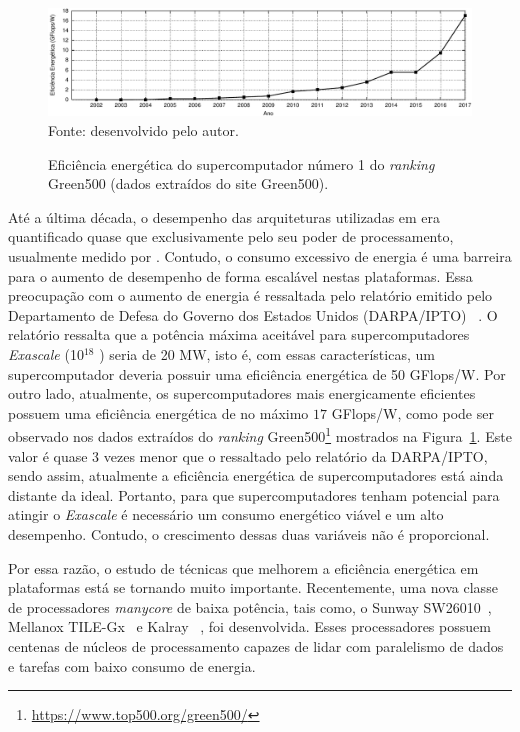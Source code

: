 
\begin{figure}[t]
	\centering
	\caption{Eficiência energética do supercomputador número 1 do
        \textit{ranking} Green500 (dados extraídos do site Green500).}
    \includegraphics[width=\textwidth]{figs/green500.pdf} \\
    Fonte: desenvolvido pelo autor.
	\label{fig:graphEnergy}
\end{figure}


Até a última década, o desempenho das arquiteturas utilizadas em \hpc era quantificado quase
que exclusivamente pelo seu poder de processamento, usualmente medido por
\flops. Contudo, o consumo excessivo de energia é uma barreira para o aumento de
desempenho de forma escalável nestas plataformas.
Essa preocupação com o aumento de energia é ressaltada pelo relatório emitido
pelo Departamento de Defesa do Governo dos Estados Unidos (DARPA/IPTO)
~\cite{Kogge2008}. O relatório ressalta que a potência máxima aceitável para supercomputadores
\textit{Exascale} (10$^{18}$ \flops) seria de 20 MW, isto é, com
essas características, um supercomputador deveria possuir uma eficiência energética de 50 GFlops/W.
Por outro lado, atualmente, os supercomputadores mais energicamente eficientes
possuem uma eficiência energética de no máximo $17$ GFlops/W, como pode ser observado nos dados extraídos do \textit{ranking}
Green500\footnote{\url{https://www.top500.org/green500/}} mostrados na Figura~\ref{fig:graphEnergy}.
Este valor é quase 3 vezes menor que o ressaltado pelo
relatório da DARPA/IPTO, sendo assim, atualmente a eficiência energética de
supercomputadores está ainda distante da ideal. Portanto, para que
supercomputadores tenham potencial para atingir o \textit{Exascale} é necessário
um consumo energético viável e um alto desempenho. Contudo, o crescimento dessas
duas variáveis não é proporcional.


Por essa razão, o estudo de técnicas que melhorem a eficiência energética em
plataformas \hpc está se tornando muito importante.  Recentemente, uma nova
classe de processadores \textit{manycore} de baixa potência, tais como, o Sunway
SW26010~\cite{sunway:2016}, Mellanox TILE-Gx~\cite{Valero:2012} e Kalray
\mppa~\cite{Castro-IA3:2013}, foi desenvolvida. Esses processadores possuem
centenas de núcleos de processamento capazes de lidar com paralelismo de dados e
tarefas com baixo consumo de energia.

